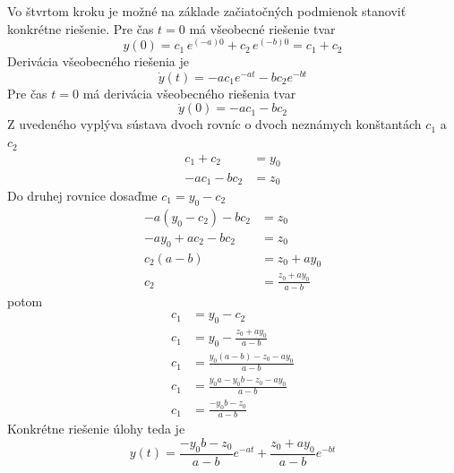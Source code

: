 \documentclass[a4paper, 10pt, ]{article}
\begin{document}
Vo štvrtom kroku je možné na základe začiatočných podmienok stanoviť konkrétne riešenie. Pre čas $t = 0$ má všeobecné riešenie tvar
\begin{equation}
    y(0)  = c_1 \, e^{(-a) 0} + c_2 \, e^{(-b) 0} = c_1 + c_2   
\end{equation}
Derivácia všeobecného riešenia je
\begin{equation}
    \dot y(t) = -a c_1 e^{-at} - b c_2 e^{-bt}
\end{equation}
Pre čas $t = 0$ má derivácia všeobecného riešenia tvar
\begin{equation}
    \dot y(0)  = -a c_1 - b c_2
\end{equation}
Z uvedeného vyplýva sústava dvoch rovníc o dvoch neznámych konštantách $c_1$ a $c_2$
\begin{subequations}
    \begin{align}
        c_1 + c_2 &= y_0 \\
        -a c_1 - b c_2 &= z_0
    \end{align}
\end{subequations}
Do druhej rovnice dosaďme $c_1 = y_0 - c_2$
\begin{subequations}
    \begin{align}
        -a (y_0 - c_2) - b c_2 &= z_0 \\
        -a y_0 + a c_2 - b c_2 &= z_0 \\
        c_2 (a - b) &= z_0 + a y_0 \\
        c_2 &= \frac{z_0 + a y_0}{a - b}
    \end{align}
\end{subequations}
potom
\begin{subequations}
    \begin{align}
        c_1 &= y_0 - c_2 \\
        c_1 &= y_0 - \frac{z_0 + a y_0}{a - b} \\  
        c_1 &= \frac{y_0 (a - b) - z_0 - a y_0}{a - b}\\
        c_1 &= \frac{y_0 a - y_0 b - z_0 - a y_0}{a - b}\\
        c_1 &= \frac{- y_0 b - z_0}{a - b}          
    \end{align}
\end{subequations}
Konkrétne riešenie úlohy teda je
\begin{equation}
    y(t) = \frac{- y_0 b - z_0}{a - b} e^{-at} + \frac{z_0 + a y_0}{a - b} e^{-bt}
\end{equation}

























\printbibliography[title={Literatúra}]
\end{document}
